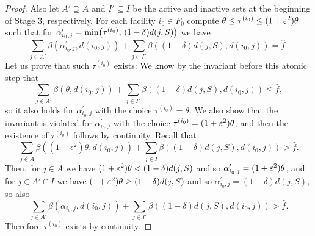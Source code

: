\begin{proof}
Also let $A' \supseteq A$ and $I' \subseteq I$ be the active and inactive sets at the beginning of Stage 3, respectively.
For each facility $i_0 \in F_0$ compute $\theta \le \tau^{(i_0)} \le (1+\varepsilon^2)\theta$ such that for $\alpha^\prime_{i_0,j} = \min\bigl(\tau^{(i_0)},\,(1-\delta)d(j,S)\bigr)$ we have
\[
    \sum_{j \in A'} \beta(\alpha^\prime_{i_0,j}, d(i_0,j)) + \sum_{j \in I'} \beta((1-\delta)d(j, S), d(i_0,j)) = \hat f\,.
\]
Let us prove that such $\tau^{(i_0)}$ exists: We know by the invariant before this atomic step that
\[\sum_{j \in A'} \beta(\theta, d(i_0,j)) + \sum_{j \in I'} \beta((1-\delta)d(j, S), d(i_0,j)) \leq \hat f,\]
so it also holds for $\alpha^\prime_{i_0,j}$ with the choice $\tau^{(i_0)} = \theta$.
We also show that the invariant is violated for $\alpha^\prime_{i_0,j}$ with the choice $\tau^{(i_0)} = (1+\varepsilon^2)\theta$, and then the existence of $\tau^{(i_0)}$ follows by continuity.
Recall that
\[\sum_{j \in A} \beta((1+\epsilon^2)\theta, d(i_0,j)) + \sum_{j \in I} \beta((1-\delta)d(j, S), d(i_0,j)) > \hat f.\]
Then, for $j \in A$ we have $(1+\varepsilon^2)\theta < (1-\delta)d(j,S)$ and so $\alpha^\prime_{i_0,j} = (1+\varepsilon^2)\theta$, and for $j \in A' \cap I$ we have $(1+\varepsilon^2)\theta \geq (1-\delta) d(j,S)$ and so $\alpha^\prime_{i_0,j} = (1-\delta)d(j,S)$, so also
\[\sum_{j \in A'} \beta(\alpha^\prime_{i_0,j}, d(i_0,j)) + \sum_{j \in I'} \beta((1-\delta)d(j, S), d(i_0,j)) > \hat f.\]
Therefore $\tau^{(i_0)}$ exists by continuity.


\end{proof}
